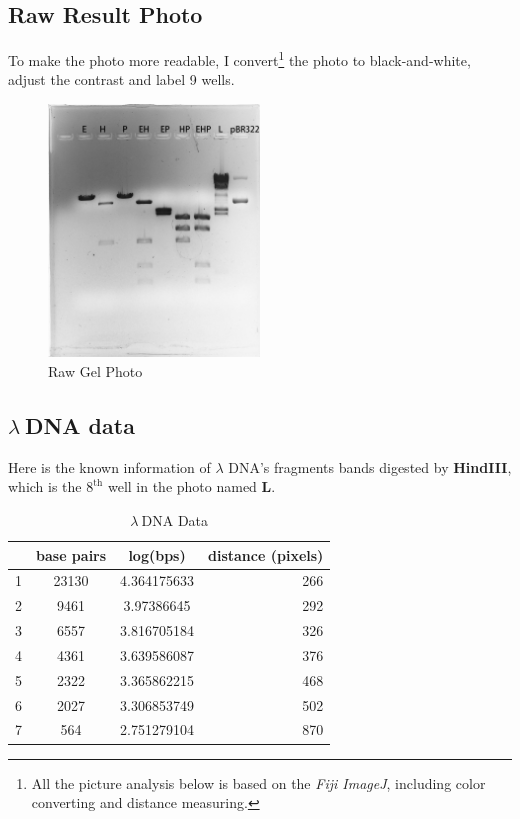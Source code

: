 \documentclass{article}
\begin{document}
        \subsection{Raw Result Photo}
            To make the photo more readable, I convert\footnote{All the picture analysis below is based on the \textit{Fiji ImageJ}, including color converting and distance measuring.}
            the photo to black-and-white, adjust the contrast and label 9 wells.
            \begin{figure}[H]
                \centering
                \includegraphics[width = 0.5\textwidth]{../Data/xun_and_sam.png}
                \caption{Raw Gel Photo}
            \end{figure}

        \subsection{\boldmath$\lambda\ $\unboldmath DNA data}
            Here is the known information of $\lambda$ DNA's fragments bands digested by \textbf{HindIII}, which is the $8^{\text{th}}$ well in the photo named {\bf{L}}.

            \begin{table}[H]
                \caption{$\lambda\ $DNA Data}
                \centering
                \begin{tabular}{|l|c|c|r|}
                    \hline
                    &base pairs&log(bps)&distance (pixels)\\
                    \hline
                    1&      23130&4.364175633&266\\
                    2&      9461&3.97386645&292\\
                    3&      6557&3.816705184&326\\
                    4&      4361&3.639586087&376\\
                    5&      2322&3.365862215&468\\
                    6&      2027&3.306853749&502\\
                    7&      564&2.751279104&870\\
                    \hline
                \end{tabular}
                \label{l.data}
            \end{table}
\end{document}
